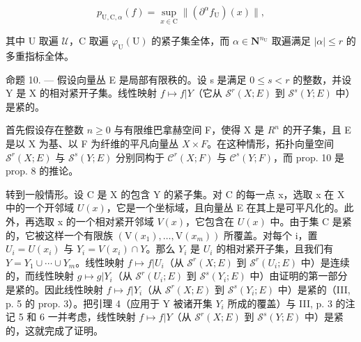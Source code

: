 \[
p _ {\mathrm{U,C}, \alpha} (f) = \sup _ {x \in \mathrm{C}} \| (\partial^ {\alpha} f _ {\mathrm{U}}) (x) \|,
\]

其中 U 取遍 \(\mathcal{U}\)，C 取遍 \(\varphi_{\mathrm{U}}(\mathrm{U})\) 的紧子集全体，而 \(\alpha \in \mathbf{N}^{n_{\mathrm{U}}}\) 取遍满足 \(|\alpha| \leqslant r\) 的多重指标全体。

命题 10. --- 假设向量丛 E 是局部有限秩的。设 s 是满足 \(0 \leqslant s < r\) 的整数，并设 Y 是 X 的相对紧开子集。线性映射 \(f \mapsto f|Y\)（它从 \(\mathcal{S}^{r}(X;E)\) 到 \(\mathcal{S}^{s}(Y;E)\) 中）是紧的。

首先假设存在整数 \(n \geqslant 0\) 与有限维巴拿赫空间 F，使得 X 是 \(R^{n}\) 的开子集，且 E 是以 X 为基、以 F 为纤维的平凡向量丛 \(X \times F\)。在这种情形，拓扑向量空间 \(\mathcal{S}^{r}(X;E)\) 与 \(\mathcal{S}^{s}(Y;E)\) 分别同构于 \(\mathcal{C}^{r}(X;F)\) 与 \(\mathcal{C}^{s}(Y;F)\)，而 prop. 10 是 prop. 8 的推论。

转到一般情形。设 C 是 X 的包含 Y 的紧子集。对 C 的每一点 x，选取 x 在 X 中的一个开邻域 \(U(x)\)，它是一个坐标域，且向量丛 E 在其上是可平凡化的。此外，再选取 x 的一个相对紧开邻域 \(V(x)\)，它包含在 \(U(x)\) 中。由于集 C 是紧的，它被这样一个有限族 \((\mathrm{V}(x_{1}),\ldots,\mathrm{V}(x_{m}))\) 所覆盖。对每个 i，置 \(U_{i}=U(x_{i})\) 与 \(Y_{i}=V(x_{i})\cap Y\)。那么 \(Y_{i}\) 是 \(U_{i}\) 的相对紧开子集，且我们有 \(Y=Y_{1}\cup\cdots\cup Y_{m}\)。线性映射 \(f\mapsto f|U_{i}\)（从 \(\mathcal{S}^{r}(X;E)\) 到 \(\mathcal{S}^{r}(U_{i};E)\) 中）是连续的，而线性映射 \(g\mapsto g|Y_{i}\)（从 \(\mathcal{S}^{r}(U_{i};E)\) 到 \(\mathcal{S}^{s}(Y_{i};E)\) 中）由证明的第一部分是紧的。因此线性映射 \(f\mapsto f|Y_{i}\)（从 \(\mathcal{S}^{r}(X;E)\) 到 \(\mathcal{S}^{s}(Y_{i};E)\) 中）是紧的（III, p. 5 的 prop. 3）。把引理 4（应用于 Y 被诸开集 \(Y_{i}\) 所成的覆盖）与 III, p. 3 的注记 5 和 6 一并考虑，线性映射 \(f\mapsto f|Y\)（从 \(\mathcal{S}^{r}(X;E)\) 到 \(\mathcal{S}^{s}(Y;E)\) 中）是紧的，这就完成了证明。


